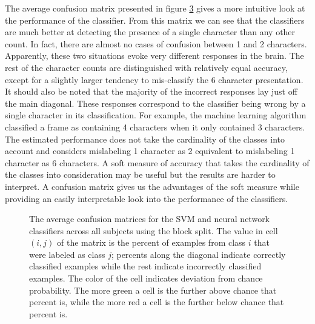 \documentclass[preprint,5p,authoryear]{elsarticle}
\begin{document}
The average confusion matrix presented in figure \ref{fig:average-confusion} gives a more intuitive look at the performance of the classifier.
From this matrix we can see that the classifiers are much better at detecting the presence of a single character than any other count.
In fact, there are almost no cases of confusion between 1 and 2 characters.
Apparently, these two situations evoke very different responses in the brain.
The rest of the character counts are distinguished with relatively equal accuracy,
except for a slightly larger tendency to mis-classify the 6 character presentation.
It should also be noted that the majority of the incorrect responses lay just off the main diagonal.
These responses correspond to the classifier being wrong by a single character in its classification.
For example, the machine learning algorithm classified a frame as containing 4 characters when it only contained 3 characters.
The estimated performance does not take the cardinality of the classes into account and considers mislabeling 1 character as 2 equivalent to mislabeling 1 character as 6 characters.
A soft measure of accuracy that takes the cardinality of the classes into consideration may be useful but the results are harder to interpret.
A confusion matrix gives us the advantages of the soft measure while providing an easily interpretable look into the performance of the classifiers.

\begin{figure}
\centering
\begin{subfigure}{0.3\textwidth}
\centering
\begin{adjustbox}{center}

\end{adjustbox}
\caption{}
\label{fig:average-confusion-svm}
\end{subfigure}
\begin{subfigure}{0.3\textwidth}
\centering
\begin{adjustbox}{center}

\end{adjustbox}
\caption{}
\label{fig:average-confusion-nn}
\end{subfigure}
\caption{The average confusion matrices for the  SVM and  neural network classifiers across all subjects using the block split.
The value in cell $(i,j)$ of the matrix is the percent of examples from class $i$ that were labeled as class $j$; percents along the diagonal indicate correctly classified examples while the rest indicate incorrectly classified examples.
The color of the cell indicates deviation from chance probability.
The more green a cell is the further above chance that percent is, while the more red a cell is the further below chance that percent is.}
\label{fig:average-confusion}
\end{figure}
\end{document}
